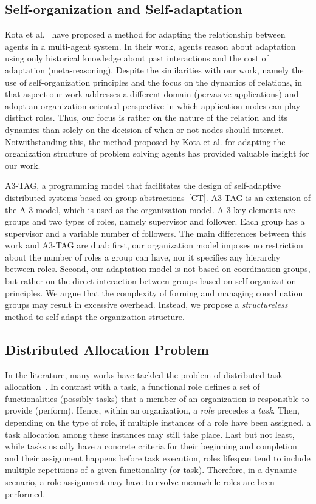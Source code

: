 \subsection{Self-organization and Self-adaptation} 
 
Kota et al.~\cite{Kota:2012} have proposed a method for adapting the relationship between agents in a multi-agent system. In their work, agents reason about adaptation using only historical knowledge about past interactions and the cost of adaptation (meta-reasoning). Despite the similarities with our work, namely the use of self-organization principles and the focus on the dynamics of relations, in that aspect our work addresses a different domain (pervasive applications) and adopt an organization-oriented perspective in which application nodes can play distinct roles. Thus, our focus is rather on the nature of the relation and its dynamics than solely on the decision of when or not nodes should interact. Notwithstanding this, the method proposed by Kota et al. for adapting the organization structure of problem solving agents has provided valuable insight for our work. 

A3-TAG, a programming model that facilitates the design of self-adaptive distributed systems based on group abstractions~[CT]. A3-TAG is an extension of the A-3 model, which is used as the organization model. A-3 key elements are groups and two types of roles, namely supervisor and follower. Each group has a supervisor and a variable number of followers. The main differences between this work and A3-TAG are dual: first, our organization model imposes no restriction about the number of roles a group can have, nor it specifies any hierarchy between roles. Second, our adaptation model is not based on coordination groups, but rather on the direct interaction between groups based on self-organization principles. We argue that the complexity of forming and managing coordination groups may result in excessive overhead. Instead, we propose a \textit{structureless} method to self-adapt the organization structure.

\subsection{Distributed Allocation Problem}

In the literature, many works have tackled the problem of distributed task allocation~\cite{DTA}. In contrast with a task, a functional role defines a set of functionalities (possibly tasks) that a member of an organization is responsible to provide (perform). Hence, within an organization, a \textit{role} precedes a \textit{task}. Then, depending on the type of role, if multiple instances of a role have been assigned, a task allocation among these instances may still take place. Last but not least, while tasks usually have a concrete criteria for their beginning and completion and their assignment happens before task execution, roles lifespan tend to include multiple repetitions of a given functionality (or task). Therefore, in a dynamic scenario, a role assignment may have to evolve meanwhile roles are been performed.

